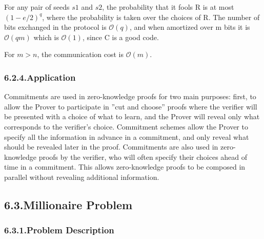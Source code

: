 \documentclass{article}
\begin{document}
For any pair of seeds $s1$ and $s2$, the probability that it fools R
is at most $(1 - e/2)^q$, where the probability is taken over the choices of R.
The number of bits exchanged in the protocol is $\mathcal{O}(q)$, and when amortized
over m bits it is $\mathcal{O}(qm)$ which is $\mathcal{O}(1)$, since C is a good code.%

For $m>n$, the communication cost is $\mathcal{O}(m)$.%

\subsubsection{6.2.4.\hspace*{0.5em}Application}\label{sec-application}%

\noindent{}Commitments are used in zero-knowledge proofs for two main purposes: first,
to allow the Prover to participate in ”cut and choose” proofs where the verifier will be presented with a choice of what to learn, and the Prover will
reveal only what corresponds to the verifier’s choice. Commitment schemes
allow the Prover to specify all the information in advance in a commitment,
and only reveal what should be revealed later in the proof. Commitments
are also used in zero-knowledge proofs by the verifier, who will often specify
their choices ahead of time in a commitment. This allows zero-knowledge
proofs to be composed in parallel without revealing additional information.%

\subsection{6.3.\hspace*{0.5em}Millionaire Problem}\label{sec-millionaire-problem}%

\subsubsection{6.3.1.\hspace*{0.5em}Problem Description}\label{sec-problem-description}%
\end{document}

